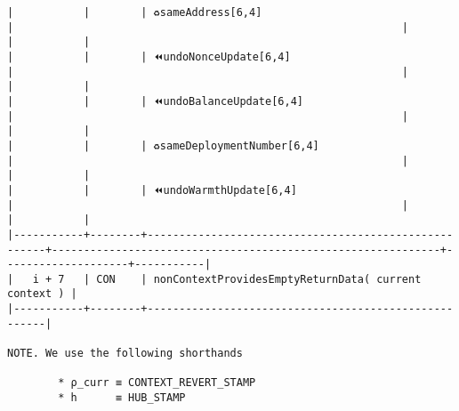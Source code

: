 \documentclass[varwidth=\maxdimen,margin=0.5cm,multi={verbatim}]{standalone}
\begin{document}
\begin{verbatim}
|           |        | ♻️sameAddress[6,4]                                    |                                                             |                    |           |
|           |        | ⏪undoNonceUpdate[6,4]                               |                                                             |                    |           |
|           |        | ⏪undoBalanceUpdate[6,4]                             |                                                             |                    |           |
|           |        | ♻️sameDeploymentNumber[6,4]                           |                                                             |                    |           |
|           |        | ⏪undoWarmthUpdate[6,4]                              |                                                             |                    |           |
|-----------+--------+------------------------------------------------------+-------------------------------------------------------------+--------------------+-----------|
|   i + 7   | CON    | nonContextProvidesEmptyReturnData( current context ) |
|-----------+--------+------------------------------------------------------|

NOTE. We use the following shorthands

        * ρ_curr ≡ CONTEXT_REVERT_STAMP
        * h      ≡ HUB_STAMP

\end{verbatim}
\end{document}
